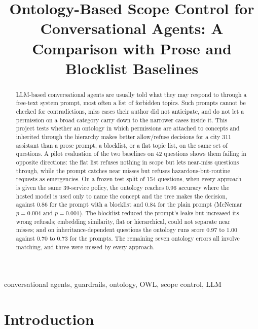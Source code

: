 \documentclass[conference]{IEEEtran}
\begin{document}
\title{Ontology-Based Scope Control for Conversational Agents: A Comparison with Prose and Blocklist Baselines}

\author{
}

\maketitle

\begin{abstract}
LLM-based conversational agents are usually told what they may respond to through a free-text system prompt, most often a list of forbidden topics. Such prompts cannot be checked for contradictions, miss cases their author did not anticipate, and do not let a permission on a broad category carry down to the narrower cases inside it. This project tests whether an ontology in which permissions are attached to concepts and inherited through the hierarchy makes better allow/refuse decisions for a city 311 assistant than a prose prompt, a blocklist, or a flat topic list, on the same set of questions. A pilot evaluation of the two baselines on 42 questions shows them failing in opposite directions: the flat list refuses nothing in scope but lets near-miss questions through, while the prompt catches near misses but refuses hazardous-but-routine requests as emergencies. On a frozen test split of 154 questions, when every approach is given the same 39-service policy, the ontology reaches 0.96 accuracy where the hosted model is used only to name the concept and the tree makes the decision, against 0.86 for the prompt with a blocklist and 0.84 for the plain prompt (McNemar $p=0.004$ and $p=0.001$). The blocklist reduced the prompt's leaks but increased its wrong refusals; embedding similarity, flat or hierarchical, could not separate near misses; and on inheritance-dependent questions the ontology runs score 0.97 to 1.00 against 0.70 to 0.73 for the prompts. The remaining seven ontology errors all involve matching, and three were missed by every approach.
\end{abstract}

\begin{IEEEkeywords}
conversational agents, guardrails, ontology, OWL, scope control, LLM
\end{IEEEkeywords}

\section{Introduction}
\end{document}
